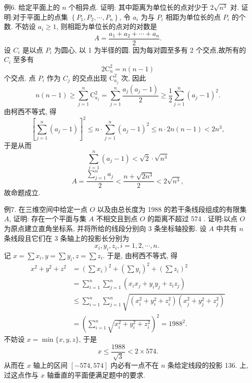 例6. 给定平面上的 $n$ 个相异点.
证明: 其中距离为单位长的点对少于 $2 \sqrt{n^3}$ 对.
证明:对于平面上的点集 $\left\{P_1, P_2, \cdots, P_n\right\}$, 令 $a_i$ 为与 $P_i$ 相距为单位长的点 $P_i$ 的个数.
不妨设 $a_i \geqslant 1$, 则相距为单位长的点对的对数是
$$
A=\frac{a_1+a_2+\cdots+a_n}{2} .
$$
设 $C_i$ 是以点 $P_i$ 为圆心, 以 1 为半径的圆.
因为每对圆至多有 2 个交点,故所有的 $C_i$ 至多有
$$
2 \mathrm{C}_n^2=n(n-1)
$$
个交点.
点 $P_i$ 作为 $C_j$ 的交点出现 $\mathrm{C}_{a_j}^2$ 次, 因此
$$
n(n-1) \geqslant \sum_{j=1}^n \mathrm{C}_{a_j}^2=\sum_{j=1}^n \frac{a_j\left(a_j-1\right)}{2} \geqslant \frac{1}{2} \sum_{j=1}^n\left(a_j-1\right)^2 .
$$
由柯西不等式, 得
$$
\left[\sum_{j=1}^n\left(a_j-1\right)\right]^2 \leqslant n \cdot \sum_{j=1}^n\left(a_j-1\right)^2 \leqslant n \cdot 2 n(n-1)<2 n^3,
$$
于是从而
$$
\sum_{j=1}^n\left(a_j-1\right)<\sqrt{2} \cdot \sqrt{n^3}
$$
$$
A=\frac{\sum_{j=1}^n a_j}{2}<\frac{n+\sqrt{2 n^3}}{2}<2 \sqrt{n^3},
$$
故命题成立.



例7. 在三维空间中给定一点 $O$ 以及由总长度为 1988 的若干条线段组成的有限集 $A$, 证明: 存在一个平面与集 $A$ 不相交且到点 $O$ 的距离不超过 574 .
证明:以点 $O$ 为原点建立直角坐标系, 并将所给的线段分别向 3 条坐标轴投影.
设 $A$ 中共有 $n$ 条线段且它们在 3 条轴上的投影长分别为
$$
x_i, y_i, z_i, i=1,2, \cdots, n \text {. }
$$
记 $x=\sum x_i, y=\sum y_i, z=\sum z_i$. 于是, 由柯西不等式, 得
$$
\begin{aligned}
x^2+y^2+z^2 & =\left(\sum x_i\right)^2+\left(\sum y_i\right)^2+\left(\sum z_i\right)^2 \\
& =\sum_{i=1}^n \sum_{j=1}^n\left(x_i x_j+y_i y_j+z_i z_j\right) \\
& \leqslant \sum_{i=1}^n \sum_{j=1}^n \sqrt{\left(x_i^2+y_i^2+z_i^2\right)\left(x_j^2+y_j^2+z_j^2\right)} \\
& =\left(\sum_{i=1}^n \sqrt{x_i^2+y_i^2+z_i^2}\right)^2=1988^2 .
\end{aligned}
$$
不妨设 $x=\min \{x, y, z\}$, 于是
$$
x \leqslant \frac{1988}{\sqrt{3}}<2 \times 574 .
$$
从而在 $x$ 轴上的区间 $[-574,574]$ 内必有一点不在 $n$ 条给定线段的投影
136. 上,过这点作与 $x$ 轴垂直的平面便满足题中的要求.




